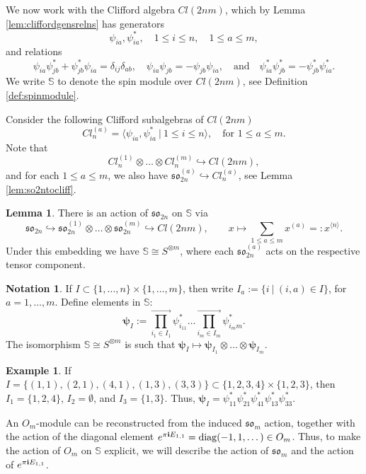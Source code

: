 \documentclass[10pt]{amsart}
\numberwithin{equation}{section}
\theoremstyle{definition}
\newtheorem{lemma}[theorem]{Lemma}
\newtheorem{example}[theorem]{Example}
\newtheorem{notation}[theorem]{Notation}
\newcommand{\son}[1][2n]{\mathfrak{so}_{#1}}
\newcommand{\som}[1][m]{\mathfrak{so}_{#1}}
\newcommand{\ot}{\otimes}
\newcommand{\hwp}{\boldsymbol{\psi}}
\newcommand{\howespin}{\boldsymbol{\mathbb{S}}}
\begin{document}
We now work with the Clifford algebra $Cl(2nm)$, which by Lemma \ref{lem:cliffordgensrelns} has generators
\[
\psi_{ia},\psi_{ia}^{*}, \quad 1\le i \le n, \quad 1\le a \le m,
\]
and relations
\begin{equation}\label{eq:cliffrelns}
\psi_{ia}\psi_{jb}^* +\psi_{jb}^*\psi_{ia} = \delta_{ij}\delta_{ab}, \quad \psi_{ia}\psi_{jb}=-\psi_{jb}\psi_{ia}, \quad \text{and} \quad \psi_{ia}^*\psi_{jb}^*=-\psi_{jb}^*\psi_{ia}^*.
\end{equation}
We write $\howespin$ to denote the spin module over $Cl(2nm)$, see Definition \ref{def:spinmodule}. 

Consider the following Clifford subalgebras of $Cl(2nm)$
\[
Cl_n^{(a)}=\langle \psi_{ia}, \psi_{ia}^* \ | \ 1\le i \le n \rangle, \quad \text{for $1\le a \le m$}.
\] 
Note that
\[
Cl_n^{(1)}\otimes \dots\otimes  Cl_n^{(m)}\hookrightarrow Cl(2nm),
\]
and for each $1\le a\le m$, we also have $\son^{(a)}\hookrightarrow Cl_n^{(a)}$, see Lemma \ref{lem:so2ntocliff}. 

\begin{lemma}\label{lem:Sisso2nmodule}
There is an action of $\son$ on $\howespin$ via
\[
\son \hookrightarrow\son^{(1)}\otimes \dots \otimes \son^{(m)} \hookrightarrow Cl(2nm),
\qquad 
x \mapsto \sum_{1\le a \le m} {x}^{(a)} =: {x}^{\langle n \rangle}.
\]
Under this embedding we have $\howespin\cong S^{\ot m}$, where each $\son^{(a)}$ acts on the respective tensor component.
\end{lemma}

\begin{notation}\label{not:psibasis}
    If $I\subset \{1, \dots, n\}\times \{1, \dots, m\}$, then write $I_a:=\{i \ | \ (i,a)\in I\}$, for $a=1, \dots, m$. Define elements in $\howespin$:
    \[
    \hwp_{I}:=\prod^{\rightarrow}_{i_1\in I_1}\psi_{i_11}^* \dots  \prod^{\rightarrow}_{i_m\in I_m}\psi_{i_mm}^*.
    \]
    The isomorphism $\howespin\cong S^{\otimes m}$ is such that $\hwp_{I}\mapsto \hwp_{I_1}\otimes \dots \otimes \hwp_{I_m}$.
\end{notation}

\begin{example}
    If $I=\{(1,1), (2,1), (4,1), (1,3),(3,3)\}\subset \{1,2,3,4\}\times \{1,2,3\}$, then $I_1=\{1,2,4\}$, $I_2= \emptyset$, and $I_3 = \{1,3\}$. Thus, $\hwp_I= \psi_{11}^*\psi_{21}^*\psi_{41}^*\psi_{13}^*\psi_{33}^*$.
\end{example}

An $O_m$-module can be reconstructed from the induced $\som$ action, together with the action of the diagonal element $e^{\pi{\bf i}E_{1,1}}={\rm diag}(-1,1,\dots)\in O_m$. Thus, to make the action of $O_m$ on $\howespin$ explicit, we will describe the action of $\som$ and the action of $e^{\pi{\bf i}E_{1,1}}$.
\end{document}
